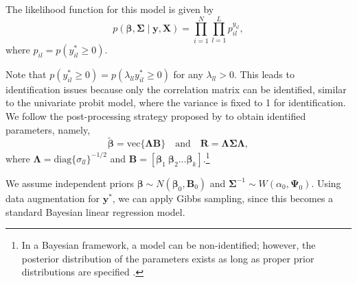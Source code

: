 The likelihood function for this model is given by
\[
p(\bm{\beta}, \bm{\Sigma} \mid \bm{y}, \bm{X}) = \prod_{i=1}^N \prod_{l=1}^L p_{il}^{y_{il}},
\]
where \( p_{il} = p(y_{il}^* \geq 0) \).

Note that \( p(y_{il}^* \geq 0) = p(\lambda_{ll} y_{il}^* \geq 0) \) for any \( \lambda_{ll} > 0 \). This leads to identification issues because only the correlation matrix can be identified, similar to the univariate probit model, where the variance is fixed to 1 for identification. We follow the post-processing strategy proposed by \cite{Edwards2003} to obtain identified parameters, namely,
\[
\tilde{\bm{\beta}} = \mathrm{vec}\{\bm{\Lambda}\bm{B}\}
\quad \text{and} \quad 
\bm{R} = \bm{\Lambda}\bm{\Sigma}\bm{\Lambda},
\]
where \( \bm{\Lambda} = \mathrm{diag}\{\sigma_{ll}\}^{-1/2} \) and \( \bm{B} = [\bm{\beta}_1 \ \bm{\beta}_2 \dots \bm{\beta}_k] \).\footnote{In a Bayesian framework, a model can be non-identified; however, the posterior distribution of the parameters exists as long as proper prior distributions are specified \cite{Edwards2003}.}

We assume independent priors \( \bm{\beta} \sim N(\bm{\beta}_0, \bm{B}_0) \) and \( \bm{\Sigma}^{-1} \sim W(\alpha_0, \bm{\Psi}_0) \). Using data augmentation for \( \bm{y}^* \), we can apply Gibbs sampling, since this becomes a standard Bayesian linear regression model.

